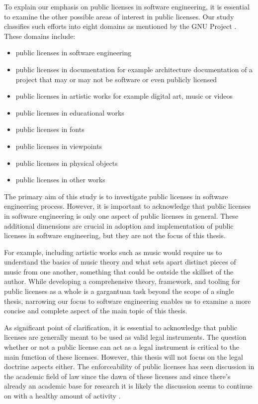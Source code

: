 To explain our emphasis on public licenses in software engineering, it is essential to examine the other possible areas of interest in public licenses. Our study classifies such efforts into eight domains as mentioned by the GNU Project \citep{gnu:licenselist}. These domains include:
\begin{itemize}
	\item public licenses in software engineering
	\item public licenses in documentation for example architecture documentation of a project that may or may not be software or even publicly licensed
	\item public licenses in artistic works for example digital art, music or videos
	\item public licenses in educational works
	\item public licenses in fonts
	\item public licenses in viewpoints
	\item public licenses in physical objects
	\item public licenses in other works
\end{itemize}
The primary aim of this study is to investigate public licenses in software engineering process. However, it is important to acknowledge that public licenses in software engineering is only one aspect of public licenses in general. These additional dimensions are crucial in adoption and implementation of public licenses in software engineering, but they are not the focus of this thesis.

For example, including artistic works such as music would require us to understand the basics of music theory and what sets apart distinct pieces of music from one another, something that could be outside the skillset of the author. While developing a comprehensive theory, framework, and tooling for public licenses as a whole is a gargantuan task beyond the scope of a single thesis, narrowing our focus to software engineering enables us to examine a more concise and complete aspect of the main topic of this thesis.

As significant point of clarification, it is essential to acknowledge that public licenses are generally meant to be used as valid legal instruments. The question whether or not a public license can act as a legal instrument is critical to the main function of these licenses. However, this thesis will not focus on the legal doctrine aspects either. The enforceability of public licenses has seen discussion in the academic field of law since the dawn of these licenses and since there's already an academic base for research it is likely the discussion seems to continue on with a healthy amount of activity \citep{duisburg2011gpl}.

